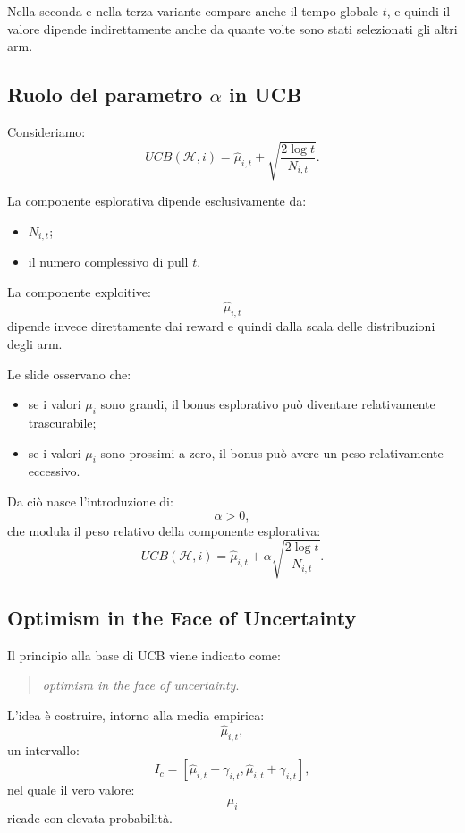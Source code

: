 Nella seconda e nella terza variante compare anche il tempo globale $t$, e quindi il valore dipende indirettamente anche da quante volte sono stati selezionati gli altri arm.

\subsection{Ruolo del parametro $\alpha$ in UCB}

Consideriamo:
\[
UCB(\mathcal{H},i)
=
\widehat{\mu}_{i,t}
+
\sqrt{
\frac{2\log t}{N_{i,t}}
}.
\]

La componente esplorativa dipende esclusivamente da:
\begin{itemize}
    \item $N_{i,t}$;
    \item il numero complessivo di pull $t$.
\end{itemize}

La componente exploitive:
\[
\widehat{\mu}_{i,t}
\]
dipende invece direttamente dai reward e quindi dalla scala delle distribuzioni degli arm.

Le slide osservano che:
\begin{itemize}
    \item se i valori $\mu_i$ sono grandi, il bonus esplorativo può diventare relativamente trascurabile;
    \item se i valori $\mu_i$ sono prossimi a zero, il bonus può avere un peso relativamente eccessivo.
\end{itemize}

Da ciò nasce l'introduzione di:
\[
\alpha>0,
\]
che modula il peso relativo della componente esplorativa:
\[
UCB(\mathcal{H},i)
=
\widehat{\mu}_{i,t}
+
\alpha
\sqrt{
\frac{2\log t}{N_{i,t}}
}.
\]

\newpage

\subsection{Optimism in the Face of Uncertainty}

Il principio alla base di UCB viene indicato come:
\begin{quote}
\emph{optimism in the face of uncertainty}.
\end{quote}

L'idea è costruire, intorno alla media empirica:
\[
\widehat{\mu}_{i,t},
\]
un intervallo:
\[
I_c
=
\left[
\widehat{\mu}_{i,t}-\gamma_{i,t},
\widehat{\mu}_{i,t}+\gamma_{i,t}
\right],
\]
nel quale il vero valore:
\[
\mu_i
\]
ricade con elevata probabilità.

